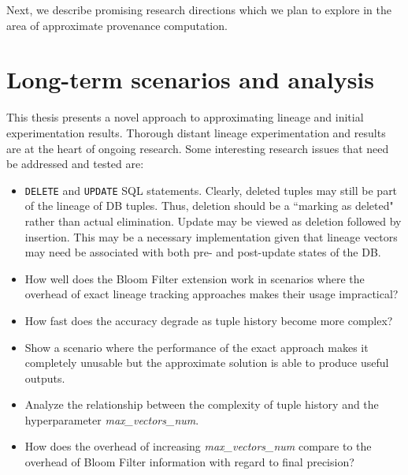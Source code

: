 \par Next, we describe promising research directions which we plan to explore in the area of approximate provenance computation.


\section{Long-term scenarios and analysis}
This thesis presents a novel approach to approximating lineage and initial experimentation results. Thorough distant lineage experimentation and results are at the heart of ongoing research. Some interesting research issues that need be addressed and tested are:
\begin{itemize}
    \item \texttt{DELETE} and \texttt{UPDATE} SQL statements. Clearly, deleted tuples may still be part of the lineage of DB tuples. Thus, deletion should be a ``marking as deleted" rather than actual elimination. Update may be viewed as  deletion followed by insertion. This may be a necessary implementation given that lineage vectors may need be associated with both pre- and post-update states of the DB.  
    \item How well does the Bloom Filter extension work in scenarios where the overhead of exact lineage tracking approaches makes their usage impractical?
    \item How fast does the accuracy degrade as tuple history become more complex?
    \item Show a scenario where the performance of the exact approach makes it completely unusable but the approximate solution is able to produce useful outputs.
    \item Analyze the relationship between the complexity of tuple history and the hyperparameter \textit{max\_vectors\_num}.
    \item How does the overhead of increasing \textit{max\_vectors\_num} compare to the overhead of Bloom Filter information with regard to final precision?
\end{itemize}

